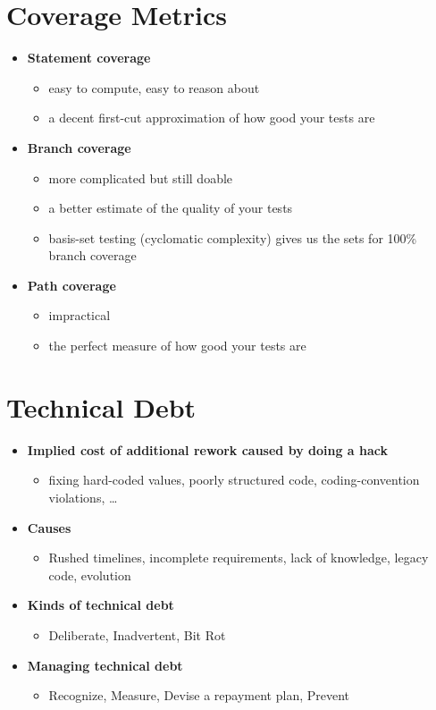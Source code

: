 \section{Coverage Metrics}

\begin{itemize}
  \item \textbf{Statement coverage}
  \begin{itemize}
    \item easy to compute, easy to reason about
    \item a decent first-cut approximation of how good your tests are
  \end{itemize}
  \item \textbf{Branch coverage}
  \begin{itemize}
    \item more complicated but still doable
    \item a better estimate of the quality of your tests
    \item basis-set testing (cyclomatic complexity) gives us the sets for 100\% branch coverage
  \end{itemize}
  \item \textbf{Path coverage}
  \begin{itemize}
    \item impractical
    \item the perfect measure of how good your tests are
  \end{itemize}
\end{itemize}

\section{Technical Debt}

\begin{itemize}
  \item \textbf{Implied cost of additional rework caused by doing a hack}
  \begin{itemize}
    \item fixing hard-coded values, poorly structured code, coding-convention violations, \ldots
  \end{itemize}
  \item \textbf{Causes}
  \begin{itemize}
    \item Rushed timelines, incomplete requirements, lack of knowledge, legacy code, evolution
  \end{itemize}
  \item \textbf{Kinds of technical debt}
  \begin{itemize}
    \item Deliberate, Inadvertent, Bit Rot
  \end{itemize}
  \item \textbf{Managing technical debt}
  \begin{itemize}
    \item Recognize, Measure, Devise a repayment plan, Prevent
  \end{itemize}
\end{itemize}

